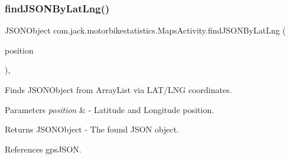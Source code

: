 \subsubsection{\texorpdfstring{find\+J\+S\+O\+N\+By\+Lat\+Lng()}{findJSONByLatLng()}}
{\footnotesize\ttfamily J\+S\+O\+N\+Object com.\+jack.\+motorbikestatistics.\+Maps\+Activity.\+find\+J\+S\+O\+N\+By\+Lat\+Lng (\begin{DoxyParamCaption}\item[{Lat\+Lng}]{position }\end{DoxyParamCaption})\hspace{0.3cm}{\ttfamily [inline]}, {\ttfamily [private]}}



Finds J\+S\+O\+N\+Object from Array\+List via L\+A\+T/\+L\+NG coordinates. 


\begin{DoxyParams}{Parameters}
{\em position} & -\/ Latitude and Longitude position. \\
\hline
\end{DoxyParams}
\begin{DoxyReturn}{Returns}
J\+S\+O\+N\+Object -\/ The found J\+S\+ON object. 
\end{DoxyReturn}


References gps\+J\+S\+ON.


